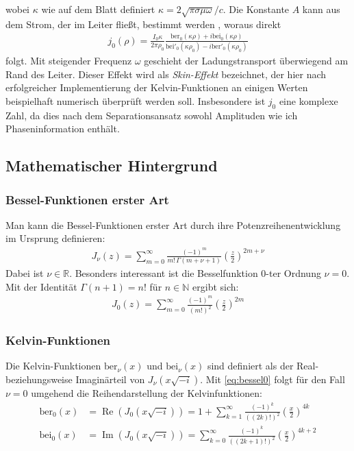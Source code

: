 \documentclass[10pt,a4paper]{article}
\begin{document}
wobei $\kappa$ wie auf dem Blatt definiert $\kappa = 2 \sqrt{\pi \sigma \mu \omega}/c$.
Die Konstante $A$ kann aus dem Strom, der im Leiter fließt, bestimmt werden \cite{kazimierczuk}, woraus direkt
\begin{align}
	j_0(\rho) = \frac{I_0 \kappa}{2\pi\rho_0}\frac{\mathrm{ber}_0(\kappa\rho)+i \mathrm{bei}_0(\kappa\rho)}{\mathrm{bei}'_0(\kappa\rho_0)-i\mathrm{ber}'_0(\kappa\rho_0)}
\end{align}
folgt. Mit steigender Frequenz $\omega$ geschieht der Ladungstransport überwiegend am Rand des Leiter. Dieser Effekt wird als \emph{Skin-Effekt} bezeichnet, der hier nach erfolgreicher Implementierung der Kelvin-Funktionen an einigen Werten beispielhaft numerisch überprüft werden soll. Insbesondere ist $j_0$ eine komplexe Zahl, da dies nach dem Separationsansatz sowohl Amplituden wie ich Phaseninformation enthält.
\subsection{Mathematischer Hintergrund}

\subsubsection{Bessel-Funktionen erster Art}

Man kann die Bessel-Funktionen erster Art durch ihre Potenzreihenentwicklung im Ursprung definieren:
\begin{align}
	J_\nu(z) = \sum^{\infty}_{m=0} \frac{\left( -1 \right)^m}{m! \, \Gamma(m + \nu + 1)} \left(\frac{z}{2}\right)^{2m+\nu}
\end{align}
Dabei ist $\nu \in \mathbb{R}$. Besonders interessant ist die Besselfunktion 0-ter Ordnung $\nu = 0$.
Mit der Identität $\Gamma(n+1) = n!$ für $n \in \mathbb{N}$ ergibt sich:
\begin{align}
	\label{eq:bessel0}
	J_0(z) = \sum^{\infty}_{m=0} \frac{\left( -1 \right)^m}{\left( m! \right)^2} \left( \frac{z}{2} \right)^{2m}
\end{align}

\subsubsection{Kelvin-Funktionen}

Die Kelvin-Funktionen $\mathrm{ber}_\nu(x)$ und $\mathrm{bei}_\nu(x)$ sind definiert als der Real-
beziehungsweise Imaginärteil von $J_\nu(x \sqrt{-i} )$. Mit \ref{eq:bessel0}
folgt für den Fall $\nu = 0$ umgehend die Reihendarstellung der Kelvinfunktionen:
\begin{align}
	\mathrm{ber}_0(x) &= \operatorname{Re}\left(J_0(x \sqrt{-i} )\right) = 1 + \sum^{\infty}_{k=1} \frac{\left( -1 \right)^k}{\left( \left(2k\right)! \right)^2} \left( \frac{x}{2} \right)^{4k} \label{eq:berpotenzreihe}\\
	\mathrm{bei}_0(x) &= \operatorname{Im}\left(J_0(x \sqrt{-i} )\right) = \sum^{\infty}_{k=0} \frac{\left( -1 \right)^k}{\left( \left(2k+1\right)! \right)^2} \left( \frac{x}{2} \right)^{4k+2}\label{eq:beipotenzreihe}
\end{align}
\end{document}
